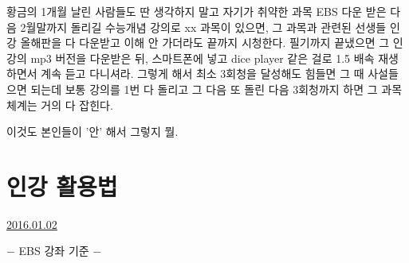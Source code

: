 황금의 1개월 날린 사람들도 딴 생각하지 말고 자기가 취약한 과목 EBS 다운 받은 다음 2월말까지 돌리길
수능개념 강의로 xx 과목이 있으면, 그 과목과 관련된 선생들 인강 올해판을 다 다운받고 이해 안 가더라도 끝까지 시청한다.
필기까지 끝냈으면 그 인강의 mp3 버전을 다운받은 뒤, 스마트폰에 넣고 dice player 같은 걸로 1.5 배속 재생하면서 계속 듣고 다니셔라.
그렇게 해서 최소 3회청을 달성해도 힘들면 그 때 사설들으면 되는데
보통 강의를 1번 다 돌리고 그 다음 또 돌린 다음 3회청까지 하면 그 과목 체계는 거의 다 잡힌다.
\vspace{5mm}

이것도 본인들이 '안' 해서 그렇지 뭘.
\vspace{5mm}






\section{인강 활용법}
\href{https://www.kockoc.com/Apoc/572680}{2016.01.02}

\vspace{5mm}

$-$ EBS 강좌 기준 $-$
\vspace{5mm}

